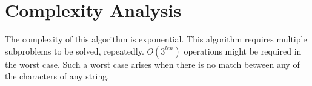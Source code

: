 \documentclass[a4paper,10pt,twoside]{article}
\begin{document}
\section{Complexity Analysis}
The complexity of this algorithm is exponential. This algorithm requires multiple subproblems to be solved, repeatedly. $O(3^{len})$ operations might be required in the worst case. Such a worst case arises when there is no match between any of the characters of any string.
\begin{figure}
	\centering
	\begin{subfigure}[t]{0.3\columnwidth}
		\centering
		\label{fig:bulk}
		\caption{}
		\label{fig:bulk}
	\end{subfigure}
	\begin{subfigure}[t]{0.3\columnwidth}
		\centering

\end{subfigure}
\end{figure}
\end{document}
